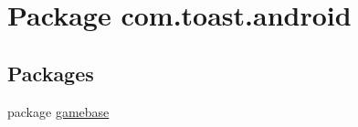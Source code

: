 \hypertarget{namespacecom_1_1toast_1_1android}{}\section{Package com.\+toast.\+android}
\label{namespacecom_1_1toast_1_1android}
\subsection*{Packages}
\begin{DoxyCompactItemize}
\item 
package \hyperlink{namespacecom_1_1toast_1_1android_1_1gamebase}{gamebase}
\end{DoxyCompactItemize}
